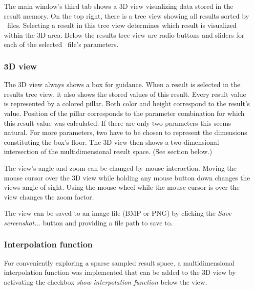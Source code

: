 The main window's third tab shows a 3D view visualizing data stored in the result memory.
On the top right, there is a tree view showing all results sorted by \PJOB\ files.
Selecting a result in this tree view determines which result is visualized within the 3D area.
Below the results tree view are radio buttons and sliders for each of the selected \PJOB\ file's parameters.


\subsubsection{3D view}
The 3D view always shows a box for guidance.
When a result is selected in the results tree view,
it also shows the stored values of this result.
Every result value is represented by a colored pillar.
Both color and height correspond to the result's value.
Position of the pillar corresponds to the parameter combination for which
this result value was calculated.
If there are only two parameters this seems natural.
For more parameters,
two have to be chosen to represent the dimensions constituting the box's floor.
The 3D view then shows a two-dimensional intersection of the multidimensional result space.
(See section  below.)\bb

The view's angle and zoom can be changed by mouse interaction.
Moving the mouse cursor over the 3D view while holding any mouse button down
changes the views angle of sight.
Using the mouse wheel while the mouse cursor is over the view changes the zoom factor.\bb

The view can be saved to an image file (BMP or PNG) by clicking the \textit{Save screenshot...} button
and providing a file path to save to.

\subsubsection{Interpolation function}
\label{pqueue:interpolation_function}
For conveniently exploring a sparse sampled result space,
a multidimensional interpolation function was implemented
that can be added to the 3D view by activating the checkbox \textit{show interpolation function} below the view.

